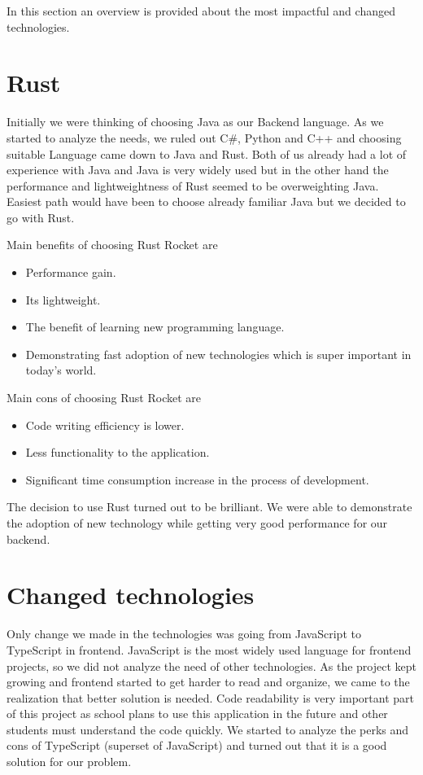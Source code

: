 In this section an overview is provided about the most impactful and changed technologies.

\section{Rust}\label{sec:rust}
Initially we were thinking of choosing Java as our Backend language.
As we started to analyze the needs, we ruled out C#, Python and C++ and choosing suitable Language came down to Java and Rust.
Both of us already had a lot of experience with Java and Java is very widely used but in the other hand the performance and lightweightness of Rust seemed to be overweighting Java.
Easiest path would have been to choose already familiar Java but we decided to go with Rust.

Main benefits of choosing Rust Rocket are
\begin{itemize}
    \item Performance gain.
    \item Its lightweight.
    \item The benefit of learning new programming language.
    \item Demonstrating fast adoption of new technologies which is super important in today's world.
\end{itemize}

Main cons of choosing Rust Rocket are
\begin{itemize}
    \item Code writing efficiency is lower.
    \item Less functionality to the application.
    \item Significant time consumption increase in the process of development.
\end{itemize}

The decision to use Rust turned out to be brilliant.
We were able to demonstrate the adoption of new technology while getting very good performance for our backend.

\section{Changed technologies}\label{sec:changed-technologies}
Only change we made in the technologies was going from JavaScript to TypeScript in frontend.
JavaScript is the most widely used language for frontend projects, so we did not analyze the need of other technologies.
As the project kept growing and frontend started to get harder to read and organize, we came to the realization that better solution is needed.
Code readability is very important part of this project as school plans to use this application in the future and other students must understand the code quickly.
We started to analyze the perks and cons of TypeScript (superset of JavaScript) and turned out that it is a good solution for our problem.

